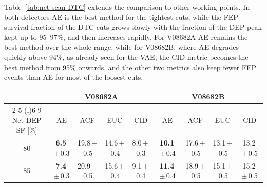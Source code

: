 Table~\ref{tab:net-scan-DTC} extends the comparison to other working points. In both detectors \ac{AE} is the best method for the tightest cuts, while the \ac{FEP} survival fraction of the \ac{DTC} cuts grows slowly with the fraction of the \ac{DEP} peak kept up to 95--97\%, and then increases rapidly. For V08682A \ac{AE} remains the best method over the whole range, while for V08682B, where \ac{AE} degrades quickly above 94\%, as already seen for the \ac{VAE}, the \ac{CID} metric becomes the best method from 95\% onwards, and the other two metrics also keep fewer \ac{FEP} events than \ac{AE} for most of the loosest cuts.

\begin{table}[H]
    \centering
    \small
    \setlength{\tabcolsep}{3pt}
    \begin{tabular}{ccccccccc}
        \toprule
        & \multicolumn{4}{c}{V08682A} & \multicolumn{4}{c}{V08682B} \\
        \cmidrule(lr){2-5} \cmidrule(l){6-9}
        Net \acs{DEP} SF [\%] & \acs{AE} & \acs{ACF} & \acs{EUC} & \acs{CID} & \acs{AE} & \acs{ACF} & \acs{EUC} & \acs{CID} \\
        \midrule
        80 & \textbf{6.5}\,$\pm$\,0.3 & 19.8\,$\pm$\,0.5 & 14.6\,$\pm$\,0.4 & 8.0\,$\pm$\,0.3 & \textbf{10.1}\,$\pm$\,0.4 & 17.6\,$\pm$\,0.5 & 13.1\,$\pm$\,0.5 & 13.2\,$\pm$\,0.5 \\
        85 & \textbf{7.4}\,$\pm$\,0.3 & 20.9\,$\pm$\,0.5 & 15.6\,$\pm$\,0.4 & 9.1\,$\pm$\,0.4 & \textbf{11.4}\,$\pm$\,0.4 & 18.9\,$\pm$\,0.5 & 15.1\,$\pm$\,0.5 & 15.2\,$\pm$\,0.5 \\

\end{tabular}
\end{table}
